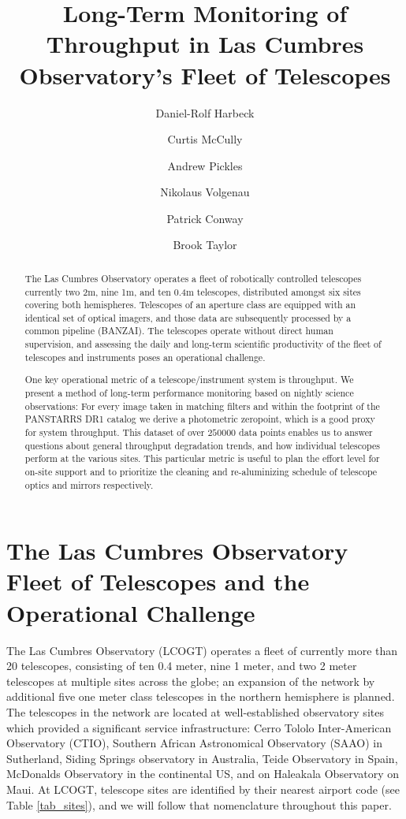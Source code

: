 \documentclass[draft]{spieman}
\title{Long-Term Monitoring of Throughput in Las Cumbres Observatory's Fleet of Telescopes}
\author[a]{Daniel-Rolf Harbeck}
\author[a]{Curtis McCully}
\author[a]{Andrew Pickles}
\author[a]{Nikolaus Volgenau}
\author[a,b]{Patrick Conway}
\author[a]{Brook Taylor}
\affil[a] {Las Cumbres Observatory, Goleta, CA (USA)}
\affil[b] {Telescope Technologies Limited, Liverpool, UK}
\begin{document}
\maketitle

\begin{abstract}
The Las Cumbres Observatory operates a fleet of robotically controlled telescopes currently two 2m,
nine 1m, and ten 0.4m telescopes, distributed amongst six sites covering both hemispheres.
Telescopes of an aperture class are equipped with an identical set of optical imagers, and those
data are subsequently processed by a common pipeline (BANZAI). The telescopes operate without direct
human supervision, and assessing the daily and long-term scientific productivity of the fleet of
telescopes and instruments poses an operational challenge.

One key operational metric of a telescope/instrument system is throughput. We present a method of
long-term performance monitoring based on nightly science observations: For every image taken in
matching filters and within the footprint of the PANSTARRS DR1 catalog we derive a photometric
zeropoint, which is a good proxy for system throughput. This dataset of over $250000$ data points
enables us to answer questions about general throughput degradation trends, and how individual
telescopes perform at the various sites. This particular metric is useful to plan the effort level
for on-site support and to prioritize the cleaning and re-aluminizing schedule of telescope optics
and mirrors respectively.
\end{abstract}




\section{The Las Cumbres Observatory Fleet of Telescopes and the Operational Challenge}

The Las Cumbres Observatory (LCOGT) operates a fleet of currently more than 20 telescopes,
consisting of ten 0.4 meter, nine 1 meter, and two 2 meter telescopes at multiple sites across the
globe\cite{brown2013}; an expansion of the network by additional five one meter class telescopes in
the northern hemisphere is planned. The telescopes in the network are located at well-established
observatory sites which provided a significant service infrastructure: Cerro Tololo Inter-American
Observatory (CTIO), Southern African Astronomical Observatory (SAAO) in Sutherland, Siding Springs
observatory in Australia, Teide Observatory in Spain, McDonalds Observatory in the continental US,
and on Haleakala Observatory on Maui. At LCOGT, telescope sites are identified by their nearest
airport code (see Table \ref{tab_sites}), and we will follow that nomenclature throughout this
paper.
\end{document}
